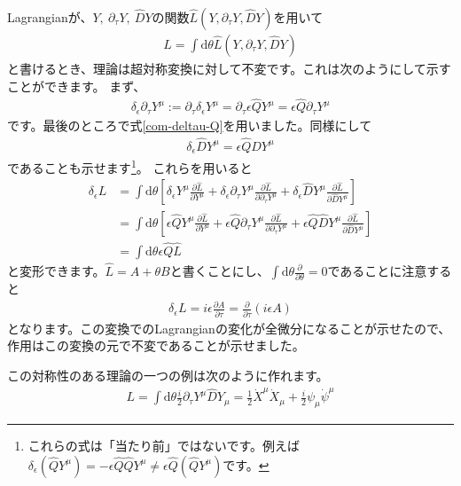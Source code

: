 \documentclass[report,paper=a4, fontsize=12pt, line_length=16cm, number_of_lines=34,dvipdfmx]{jlreq}
\numberwithin{equation}{chapter}
\numberwithin{equation}{section}
\newcommand{\del}{\partial}
\newcommand{\deldel}[2]{\frac{\del {#1}}{\del {#2}}}
\newcommand{\Qh}{\widehat{Q}}
\newcommand{\Dh}{\widehat{D}}
\newcommand{\Lh}{\widehat{L}}
\newcommand{\di}{\mathrm{d}}
\begin{document}
Lagrangianが、$Y,\ \del_{\tau}Y,\ \Dh Y$の関数$\Lh(Y,\del_{\tau}Y,\Dh Y)$を用いて
\begin{align}
L=\int \di\theta \Lh(Y,\del_{\tau}Y,\Dh Y)
\end{align}
と書けるとき、理論は超対称変換に対して不変です。これは次のようにして示すことができます。
まず、
\begin{align}
\delta_{\epsilon} \del_{\tau} Y^{\mu}:=
\del_{\tau}\delta_{\epsilon}Y^{\mu}
=\del_{\tau}\epsilon \Qh Y^{\mu}
=\epsilon \Qh \del_{\tau} Y^{\mu}
\end{align}
です。最後のところで式\eqref{com-deltau-Q}を用いました。同様にして
\begin{align}
\delta_{\epsilon} \Dh Y^{\mu}=\epsilon \Qh \Dh Y^{\mu}
\end{align}
であることも示せます\footnote{これらの式は「当たり前」ではないです。例えば$\delta_{\epsilon} (\Qh Y^{\mu})=- \epsilon \Qh \Qh Y^{\mu}
\ne\epsilon \Qh (\Qh Y^{\mu})
$です。}。
これらを用いると
\begin{align}
\delta_{\epsilon} L
&=\int \di \theta 
\left[\delta_{\epsilon} Y^{\mu}\deldel{\Lh}{Y^{\mu}}
+\delta_{\epsilon} \del_{\tau} Y^{\mu}\deldel{\Lh}{\del_{\tau} Y^{\mu}}
+\delta_{\epsilon} \Dh Y^{\mu}\deldel{\Lh}{\Dh Y^{\mu}}
\right]\nonumber\\
&=\int \di \theta 
\left[\epsilon\Qh Y^{\mu}\deldel{\Lh}{Y^{\mu}}
+\epsilon\Qh \del_{\tau} Y^{\mu}\deldel{\Lh}{\del_{\tau} Y^{\mu}}
+\epsilon\Qh \Dh Y^{\mu}\deldel{\Lh}{\Dh Y^{\mu}}
\right]\nonumber\\
&=\int \di \theta \epsilon \Qh \Lh
\end{align}
と変形できます。$\Lh=A+\theta B$と書くことにし、$\int \di \theta \deldel{}{\theta}=0$であることに注意すると
\begin{align}
\delta_{\epsilon} L=i\epsilon \deldel{A}{\tau}
=\deldel{}{\tau}(i\epsilon A)
\end{align}
となります。この変換でのLagrangianの変化が全微分になることが示せたので、作用はこの変換の元で不変であることが示せました。

この対称性のある理論の一つの例は次のように作れます。
\begin{align}
L=\int \di \theta \frac{i}{2}\del_{\tau} Y^{\mu} \Dh Y_{\mu}
=\frac12 \dot{X}^{\mu}\dot{X}_{\mu} +\frac i2 \psi_{\mu}\dot{\psi}^{\mu} 
\label{susyQM0}
\end{align}
\end{document}
